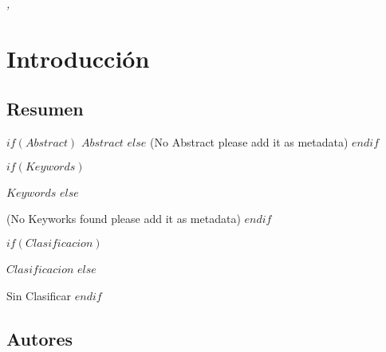 \documentclass[11pt,fleqn]{book} %
\begin{document}
\noindent \textit{\MONTH, \the\year} %



\pagestyle{empty} %

\tableofcontents %

\cleardoublepage %

\pagestyle{fancy} %



\chapter{Introducción}

\section{Resumen}

$if(Abstract)$
\textit{$Abstract$}
$else$
(No Abstract please add it as metadata)
$endif$

\vspace{5mm} %


\begin{description}
$if(Keywords)$
\item[Palabras Clave] $Keywords$
$else$
\item[Palabras Clave] (No Keyworks found please add it as metadata)
$endif$

$if(Clasificacion)$
\item[Clasificación] $Clasificacion$
$else$
\item[Clasificación] Sin Clasificar 
$endif$

\end{description}

\section{Autores}
\end{document}
